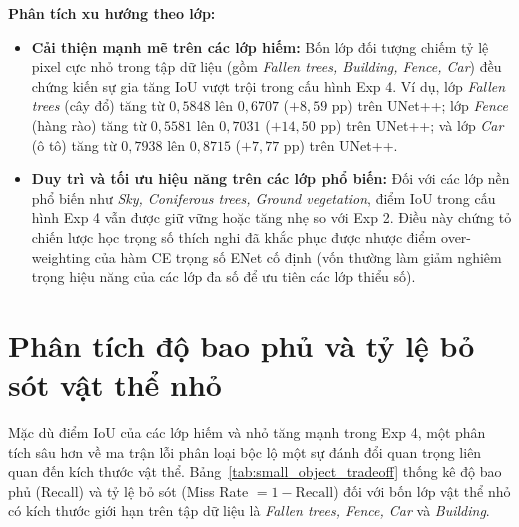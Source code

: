 \noindent\textbf{Phân tích xu hướng theo lớp:}
\begin{itemize}[leftmargin=1.4cm]
  \item \textbf{Cải thiện mạnh mẽ trên các lớp hiếm:} Bốn lớp đối tượng chiếm tỷ lệ pixel cực nhỏ trong tập dữ liệu (gồm \textit{Fallen trees, Building, Fence, Car}) đều chứng kiến sự gia tăng IoU vượt trội trong cấu hình Exp 4. Ví dụ, lớp \textit{Fallen trees} (cây đổ) tăng từ $0,5848$ lên $0,6707$ ($+8,59$ pp) trên UNet++; lớp \textit{Fence} (hàng rào) tăng từ $0,5581$ lên $0,7031$ ($+14,50$ pp) trên UNet++; và lớp \textit{Car} (ô tô) tăng từ $0,7938$ lên $0,8715$ ($+7,77$ pp) trên UNet++.
  \item \textbf{Duy trì và tối ưu hiệu năng trên các lớp phổ biến:} Đối với các lớp nền phổ biến như \textit{Sky, Coniferous trees, Ground vegetation}, điểm IoU trong cấu hình Exp 4 vẫn được giữ vững hoặc tăng nhẹ so với Exp 2. Điều này chứng tỏ chiến lược học trọng số thích nghi đã khắc phục được nhược điểm over-weighting của hàm CE trọng số ENet cố định (vốn thường làm giảm nghiêm trọng hiệu năng của các lớp đa số để ưu tiên các lớp thiểu số).
\end{itemize}

\section{Phân tích độ bao phủ và tỷ lệ bỏ sót vật thể nhỏ}
\label{sec:small_object_analysis}

Mặc dù điểm IoU của các lớp hiếm và nhỏ tăng mạnh trong Exp 4, một phân tích sâu hơn về ma trận lỗi phân loại bộc lộ một sự đánh đổi quan trọng liên quan đến kích thước vật thể. Bảng~\ref{tab:small_object_tradeoff} thống kê độ bao phủ (Recall) và tỷ lệ bỏ sót (Miss Rate $= 1 - \text{Recall}$) đối với bốn lớp vật thể nhỏ có kích thước giới hạn trên tập dữ liệu là \textit{Fallen trees, Fence, Car} và \textit{Building}.

